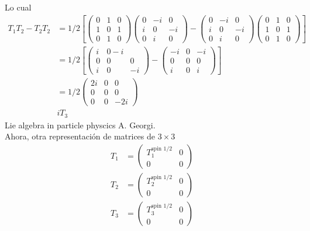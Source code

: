 \documentclass[../main.tex]{subfiles}
\begin{document}
Lo cual
\begin{align*}
  T_1T_2 - T_2 T_2 &  = 1/2 \left[ \begin{pmatrix} 0 & 1 & 0 \\ 1 & 0 & 1 \\ 0 & 1 & 0 \end{pmatrix} \begin{pmatrix} 0 & -i & 0 \\ i & 0 & -i \\ 0 & i & 0 \end{pmatrix}  - \begin{pmatrix}  0 & -i & 0 \\ i & 0 & -i \\ 0 & i & 0 \end{pmatrix}\begin{pmatrix}0 & 1 & 0 \\ 1 & 0 & 1 \\ 0 & 1 & 0 \end{pmatrix} \right] \\
& = 1/2\left[\begin{pmatrix} i & 0 -i \\ 0 & 0 & 0 \\ i & 0 & -i \end{pmatrix} - \begin{pmatrix} -i & 0 & -i \\ 0 & 0 & 0 \\ i & 0 & i \end{pmatrix}\right] \\
  & = 1/2 \begin{pmatrix} 2i & 0 & 0 \\ 0 & 0 & 0 \\ 0 & 0 & -2i \end{pmatrix} \\
    & iT_3
\end{align*}
Lie algebra in particle physcics A. Georgi. \\
Ahora, otra representación de matrices de $3\times 3$
\begin{align*}
  T_1 & = \begin{pmatrix} T_1^{\text{spin 1/2}} & 0 \\ 0 & 0 \end{pmatrix} \\
    T_2 & = \begin{pmatrix} T_2^{\text{spin 1/2}} & 0 \\ 0 & 0 \end{pmatrix} \\
      T_3 & = \begin{pmatrix} T_3^{\text{spin 1/2}} & 0 \\ 0 & 0 \end{pmatrix} 
\end{align*}
\end{document}
